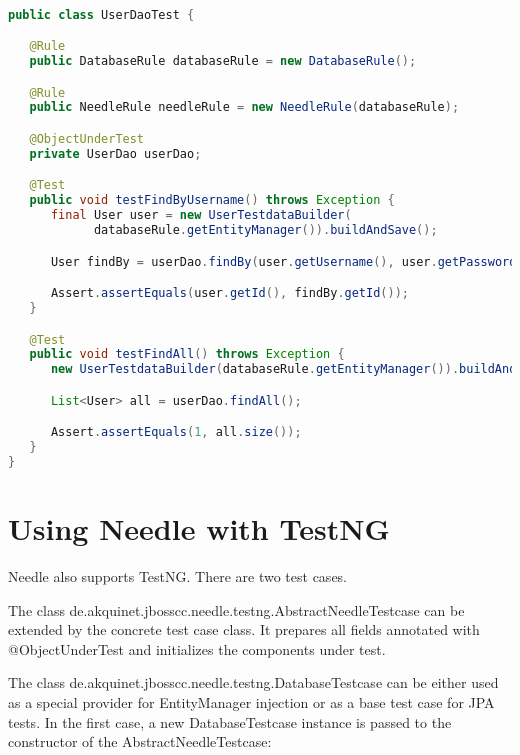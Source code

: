 \begin{lstlisting}[language={JAVA},caption=JUnit User DAO test]

public class UserDaoTest {

   @Rule
   public DatabaseRule databaseRule = new DatabaseRule();

   @Rule
   public NeedleRule needleRule = new NeedleRule(databaseRule);

   @ObjectUnderTest
   private UserDao userDao;

   @Test
   public void testFindByUsername() throws Exception {
      final User user = new UserTestdataBuilder(
            databaseRule.getEntityManager()).buildAndSave();

      User findBy = userDao.findBy(user.getUsername(), user.getPassword());

      Assert.assertEquals(user.getId(), findBy.getId());
   }

   @Test
   public void testFindAll() throws Exception {
      new UserTestdataBuilder(databaseRule.getEntityManager()).buildAndSave();

      List<User> all = userDao.findAll();

      Assert.assertEquals(1, all.size());
   }
}
\end{lstlisting}

\section{Using Needle with TestNG}
\label{sec: TestNG}

Needle also supports TestNG. There are two test cases.

The class de.akquinet.jbosscc.needle.testng.AbstractNeedleTestcase can be extended by the concrete test case class.
It prepares all fields annotated with @ObjectUnderTest and initializes the components under test.

The class de.akquinet.jbosscc.needle.testng.DatabaseTestcase can be either used as a special provider for EntityManager injection or as a base test case for JPA tests.
In the first case, a new DatabaseTestcase instance is passed to the constructor of the AbstractNeedleTestcase:

